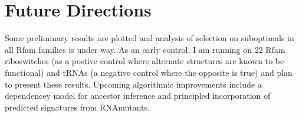 \documentclass[12pt,a4paper]{article}
\begin{document}
\section{Future Directions}
Some preliminary results are plotted and analysis of selection on suboptimals in all Rfam families is under way. As an early control, I am running on 22 Rfam riboswitches (as a postive control where alternate structures are known to be functional) and tRNAs (a negative control where the opposite is true) and plan to present these results. Upcoming algorithmic improvements include a dependencey model for ancestor inference and principled incorporation of predicted signatures from RNAmutants.
\pagebreak{}
\renewcommand{\bibfont}{\small} 

{\def\section*#1{}}
\end{document}
